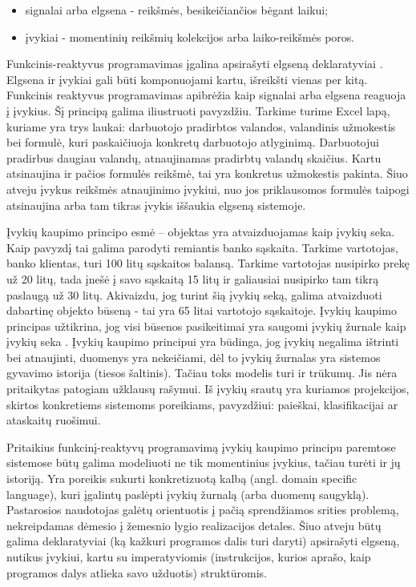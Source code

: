 \begin{itemize}
        \item signalai arba elgsena - reikšmės, besikeičiančios bėgant laikui;
        \item įvykiai - momentinių reikšmių kolekcijos arba laiko-reikšmės poros.
\end{itemize}

    Funkcinis-reaktyvus programavimas įgalina apsirašyti elgseną deklaratyviai \cite[p.1]{ElliottHudak97:Fran}. Elgsena ir įvykiai gali būti komponuojami kartu, išreikšti vienas per kitą. Funkcinis reaktyvus programavimas apibrėžia kaip signalai arba elgsena reaguoja į įvykius. \cite[p. 1]{Survey} Šį principą galima iliustruoti pavyzdžiu. Tarkime turime Excel lapą, kuriame yra trys laukai: darbuotojo pradirbtos valandos, valandinis užmokestis bei formulė, kuri paskaičiuoja konkretų darbuotojo atlyginimą. Darbuotojui pradirbus daugiau valandų, atnaujinamas pradirbtų valandų skaičius. Kartu atsinaujina ir pačios formulės reikšmė, tai yra konkretus užmokestis pakinta. Šiuo atveju įvykus reikšmės atnaujinimo įvykiui, nuo jos priklausomos formulės taipogi atsinaujina arba tam tikras įvykis iššaukia elgseną sistemoje.

    Įvykių kaupimo principo esmė – objektas yra atvaizduojamas kaip įvykių seka. Kaip pavyzdį tai galima parodyti remiantis banko sąskaita. Tarkime vartotojas, banko klientas, turi 100 litų sąskaitos balansą. Tarkime vartotojas nusipirko prekę už 20 litų, tada įnešė į savo sąskaitą 15 litų ir galiausiai nusipirko tam tikrą paslaugą už 30 litų. Akivaizdu, jog turint šią įvykių seką, galima atvaizduoti dabartinę objekto būseną - tai yra 65 litai vartotojo sąskaitoje. Įvykių kaupimo principas užtikrina, jog visi būsenos pasikeitimai yra saugomi įvykių žurnale kaip įvykių seka \cite{vernon2013implementing}. Įvykių kaupimo principui yra būdinga, jog įvykių negalima ištrinti bei atnaujinti, duomenys yra nekeičiami, dėl to įvykių žurnalas yra sistemos gyvavimo istorija (tiesos šaltinis). Tačiau toks modelis turi ir trūkumų. Jis nėra pritaikytas patogiam užklausų rašymui. Iš įvykių srautų yra kuriamos projekcijos, skirtos konkretiems sistemoms poreikiams, pavyzdžiui: paieškai, klasifikacijai ar ataskaitų ruošimui.

    Pritaikius funkcinį-reaktyvų programavimą įvykių kaupimo principu paremtose sistemose būtų galima modeliuoti ne tik momentinius įvykius, tačiau turėti ir jų istoriją. Yra poreikis sukurti konkretizuotą kalbą (angl. domain specific language), kuri įgalintų paslėpti įvykių žurnalą (arba duomenų saugyklą). Pastarosios naudotojas galėtų orientuotis į pačią sprendžiamos srities problemą, nekreipdamas dėmesio į žemesnio lygio realizacijos detales. Šiuo atveju būtų galima deklaratyviai (ką kažkuri programos dalis turi daryti) apsirašyti elgseną, nutikus įvykiui, kartu su imperatyviomis (instrukcijos, kurios aprašo, kaip programos dalys atlieka savo užduotis) struktūromis.

